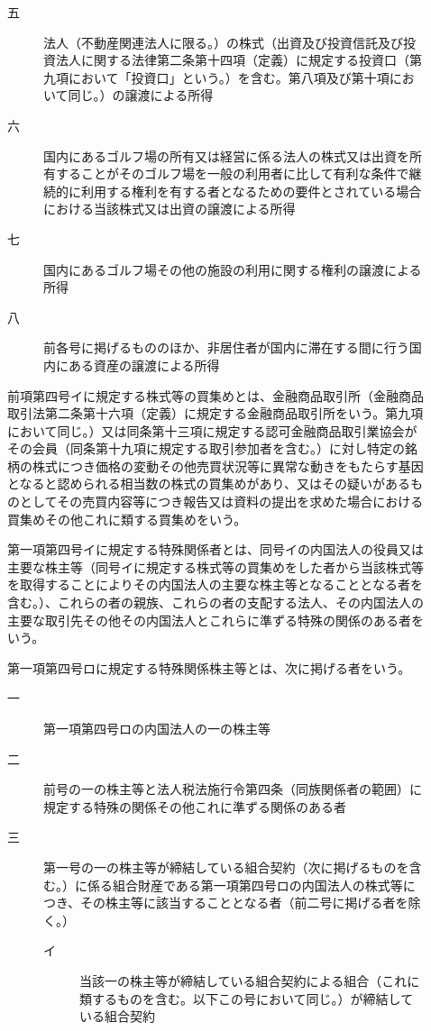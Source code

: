 \documentclass[twocolumn,a4j,10pt]{ltjtarticle}
\begin{document}
\begin{description}
\begin{description}
\begin{description}
\end{description}
\item[五]法人（不動産関連法人に限る。）の株式（出資及び投資信託及び投資法人に関する法律第二条第十四項（定義）に規定する投資口（第九項において「投資口」という。）を含む。第八項及び第十項において同じ。）の譲渡による所得
\item[六]国内にあるゴルフ場の所有又は経営に係る法人の株式又は出資を所有することがそのゴルフ場を一般の利用者に比して有利な条件で継続的に利用する権利を有する者となるための要件とされている場合における当該株式又は出資の譲渡による所得
\item[七]国内にあるゴルフ場その他の施設の利用に関する権利の譲渡による所得
\item[八]前各号に掲げるもののほか、非居住者が国内に滞在する間に行う国内にある資産の譲渡による所得
\end{description}
\item[\rensuji{2}]前項第四号イに規定する株式等の買集めとは、金融商品取引所（金融商品取引法第二条第十六項（定義）に規定する金融商品取引所をいう。第九項において同じ。）又は同条第十三項に規定する認可金融商品取引業協会がその会員（同条第十九項に規定する取引参加者を含む。）に対し特定の銘柄の株式につき価格の変動その他売買状況等に異常な動きをもたらす基因となると認められる相当数の株式の買集めがあり、又はその疑いがあるものとしてその売買内容等につき報告又は資料の提出を求めた場合における買集めその他これに類する買集めをいう。
\item[\rensuji{3}]第一項第四号イに規定する特殊関係者とは、同号イの内国法人の役員又は主要な株主等（同号イに規定する株式等の買集めをした者から当該株式等を取得することによりその内国法人の主要な株主等となることとなる者を含む。）、これらの者の親族、これらの者の支配する法人、その内国法人の主要な取引先その他その内国法人とこれらに準ずる特殊の関係のある者をいう。
\item[\rensuji{4}]第一項第四号ロに規定する特殊関係株主等とは、次に掲げる者をいう。
\begin{description}
\item[一]第一項第四号ロの内国法人の一の株主等
\item[二]前号の一の株主等と法人税法施行令第四条（同族関係者の範囲）に規定する特殊の関係その他これに準ずる関係のある者
\item[三]第一号の一の株主等が締結している組合契約（次に掲げるものを含む。）に係る組合財産である第一項第四号ロの内国法人の株式等につき、その株主等に該当することとなる者（前二号に掲げる者を除く。）
\begin{description}
\item[イ]当該一の株主等が締結している組合契約による組合（これに類するものを含む。以下この号において同じ。）が締結している組合契約

\end{description}
\end{description}
\end{description}
\end{document}
